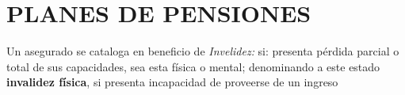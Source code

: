 \chapter{PLANES DE PENSIONES }

Un asegurado se cataloga en beneficio de \textit{Invelidez:} si: presenta pérdida parcial o total de sus capacidades, sea esta física o mental; denominando a este estado \textbf{invalidez física}, si presenta incapacidad de proveerse de un ingreso 